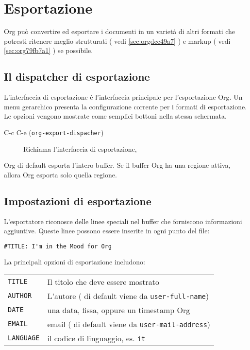 \documentclass[11pt]{article}
\begin{document}
\section{Esportazione}
\label{sec:orgaae776d}
Org può convertire ed esportare i documenti in un varietà di altri
formati che potresti ritenere meglio strutturati ( vedi \ref{sec:orgdcc49a7} ) e markup ( vedi \ref{sec:org79fb7a1} ) se
possibile.

\subsection{Il dispatcher di esportazione}
\label{sec:org4987d74}
L'interfaccia di esportazione é l'interfaccia principale per
l'esportazione Org. Un menu gerarchico presenta la configurazione
corrente per i formati di esportazione. Le opzioni vengono mostrate
come semplici bottoni nella stessa schermata.

\begin{description}
\item[{C-c C-e (\texttt{org-export-dispacher})}] Richiama l'interfaccia di esportazione,
\end{description}

Org di default esporta l'intero buffer. Se il buffer Org ha una
regione attiva, allora Org esporta solo quella regione.

\subsection{Impostazioni di esportazione}
\label{sec:orgdf97cb7}
L'esportatore riconosce delle linee speciali nel buffer che forniscono
informazioni aggiuntive. Queste linee possono essere inserite in ogni
punto del file:

\begin{verbatim}
#TITLE: I'm in the Mood for Org
\end{verbatim}


La principali opzioni di esportazione includono:

\begin{center}
\begin{tabular}{ll}
\texttt{TITLE} & Il titolo che deve essere mostrato\\[0pt]
\texttt{AUTHOR} & L'autore ( di default viene da \texttt{user-full-name})\\[0pt]
\texttt{DATE} & una data, fissa, oppure un timestamp Org\\[0pt]
\texttt{EMAIL} & email ( di default viene da \texttt{user-mail-address})\\[0pt]
\texttt{LANGUAGE} & il codice di linguaggio, es. \texttt{it}\\[0pt]
\end{tabular}
\end{center}
\end{document}
